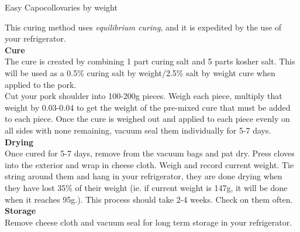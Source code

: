 \begin{recipe}{Easy Capocollo}{varies by weight}{}


    This curing method uses \emph{equilibrium curing}, and it is expedited by the use of your refrigerator.\\

    \textbf{Cure}\\
    The cure is created by combining 1 part curing salt and 5 parts kosher salt. This will be used as a 0.5\% curing salt by weight/2.5\% salt by weight cure when applied to the pork.\\

    Cut your pork shoulder into 100-200g pieces. Weigh each piece, multiply that weight by 0.03-0.04 to get the weight of the pre-mixed cure that must be added to each piece. Once the cure is weighed out and applied to each piece evenly on all sides with none remaining, vacuum seal them individually for 5-7 days.\\

    \textbf{Drying}\\
    Once cured for 5-7 days, remove from the vacuum bags and pat dry. Press cloves into the exterior and wrap in cheese cloth. Weigh and record current weight. Tie string around them and hang in your refrigerator, they are done drying when they have lost 35\% of their weight (ie. if current weight is 147g, it will be done when it reaches 95g.). This process should take 2-4 weeks. Check on them often.\\

    \textbf{Storage}\\
    Remove cheese cloth and vacuum seal for long term storage in your refrigerator.
\end{recipe}